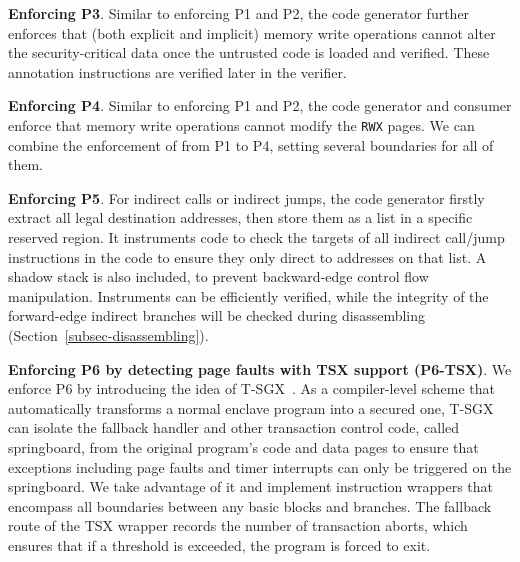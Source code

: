 {\vspace{3pt}\noindent\textbf{Enforcing P3}. Similar to enforcing P1 and P2, the code generator further enforces that (both explicit and implicit) memory write operations cannot alter the security-critical data once the untrusted code is loaded and verified. These annotation instructions are verified later in the verifier. 

\vspace{3pt}\noindent\textbf{Enforcing P4}. Similar to enforcing P1 and P2, the code generator and consumer enforce that memory write operations cannot modify the \texttt{RWX} pages. We can combine the enforcement of from P1 to P4, setting several boundaries for all of them.

\vspace{3pt}\noindent\textbf{Enforcing P5}. For indirect calls or indirect jumps, the code generator firstly extract all legal destination addresses, then store them as a list in a specific reserved region. It instruments code to check the targets of all indirect call/jump instructions in the code to ensure they only direct to addresses on that list. A shadow stack is also included, to prevent backward-edge control flow manipulation.
Instruments can be efficiently verified, while the integrity of the forward-edge indirect branches will be checked during disassembling (Section~\ref{subsec-disassembling}).


\vspace{3pt}\noindent\textbf{Enforcing P6 by detecting page faults with TSX support (P6-TSX)}.
We enforce P6 by introducing the idea of T-SGX~\cite{shih2017t}. As a compiler-level scheme that automatically transforms a normal enclave program into a secured one, T-SGX can isolate the fallback handler and other transaction control code, called springboard, from the original program’s code and data pages to ensure that exceptions including page faults and timer interrupts can only be triggered on the springboard. We take advantage of it and implement instruction wrappers that encompass all boundaries between any basic blocks and branches. The fallback route of the TSX wrapper records the number of transaction aborts, which ensures that if a threshold is exceeded, the program is forced to exit. 

}
